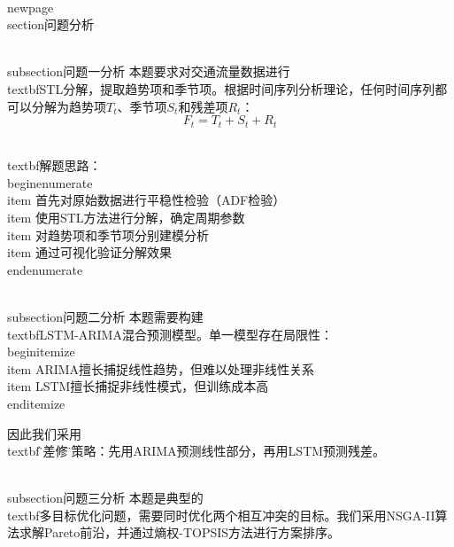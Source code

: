 \\newpage
\\section{问题分析}

\\subsection{问题一分析}
本题要求对交通流量数据进行\\textbf{STL分解}，提取趋势项和季节项。根据时间序列分析理论，任何时间序列都可以分解为趋势项$T_t$、季节项$S_t$和残差项$R_t$：
$$F_t = T_t + S_t + R_t$$

\\textbf{解题思路}：
\\begin{enumerate}
    \\item 首先对原始数据进行平稳性检验（ADF检验）
    \\item 使用STL方法进行分解，确定周期参数
    \\item 对趋势项和季节项分别建模分析
    \\item 通过可视化验证分解效果
\\end{enumerate}

\\subsection{问题二分析}
本题需要构建\\textbf{LSTM-ARIMA混合预测模型}。单一模型存在局限性：
\\begin{itemize}
    \\item ARIMA擅长捕捉线性趋势，但难以处理非线性关系
    \\item LSTM擅长捕捉非线性模式，但训练成本高
\\end{itemize}

因此我们采用\\textbf{\"残差修正\"}策略：先用ARIMA预测线性部分，再用LSTM预测残差。

\\subsection{问题三分析}
本题是典型的\\textbf{多目标优化问题}，需要同时优化两个相互冲突的目标。我们采用NSGA-II算法求解Pareto前沿，并通过熵权-TOPSIS方法进行方案排序。
